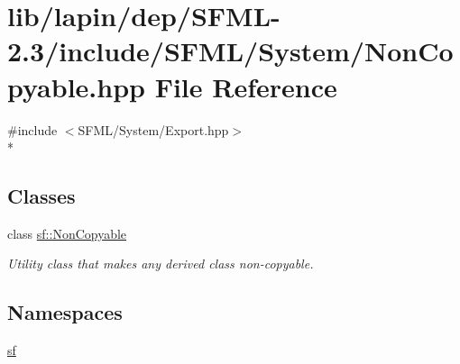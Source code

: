 \hypertarget{lapin_2dep_2_s_f_m_l-2_83_2include_2_s_f_m_l_2_system_2_non_copyable_8hpp}{\section{lib/lapin/dep/\-S\-F\-M\-L-\/2.3/include/\-S\-F\-M\-L/\-System/\-Non\-Copyable.hpp File Reference}
\label{lapin_2dep_2_s_f_m_l-2_83_2include_2_s_f_m_l_2_system_2_non_copyable_8hpp}
}
{\ttfamily \#include $<$S\-F\-M\-L/\-System/\-Export.\-hpp$>$}\\*
\subsection*{Classes}
\begin{DoxyCompactItemize}
\item 
class \hyperlink{classsf_1_1_non_copyable}{sf\-::\-Non\-Copyable}
\begin{DoxyCompactList}\small\item\em Utility class that makes any derived class non-\/copyable. \end{DoxyCompactList}\end{DoxyCompactItemize}
\subsection*{Namespaces}
\begin{DoxyCompactItemize}
\item 
\hyperlink{namespacesf}{sf}
\end{DoxyCompactItemize}
